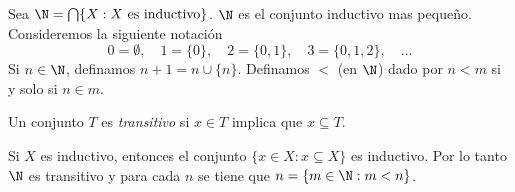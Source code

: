 Sea $\N = \bigcap\{X : X \ \text{es inductivo}\}$. $\N$ es el conjunto inductivo mas pequeño. Consideremos la siguiente notación
\[
  0 = \emptyset,\quad
  1 = \{0\},\quad
  2 = \{0,1\},\quad
  3 = \{0,1,2\},\quad
  \ldots
\]
Si $n \in \N$, definamos $n+1 = n \cup \{n\}$. Definamos $<$ (en $\N$) dado por $n < m$ si y solo si $n \in m$.

Un conjunto $T$ es \emph{transitivo} si $x \in T$ implica que $x \subseteq T$.

\begin{exercise}[1.3]
  Si $X$ es inductivo, entonces el conjunto $\{x \in X : x \subseteq X\}$ es inductivo. Por lo tanto $\N$ es transitivo y para cada $n$ se tiene que $n = \{m \in \N : m<n\}$.
\end{exercise}